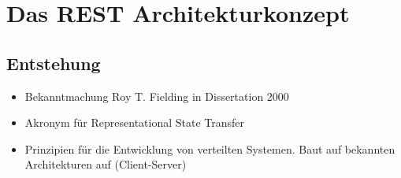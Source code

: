 \chapter{Das REST Architekturkonzept}
\section{Entstehung}
\begin{itemize}
  \item Bekanntmachung Roy T. Fielding in Dissertation 2000
  \item Akronym für Representational State Transfer
  \item Prinzipien für die Entwicklung von verteilten Systemen. Baut auf bekannten Architekturen auf (Client-Server)
\end{itemize}

